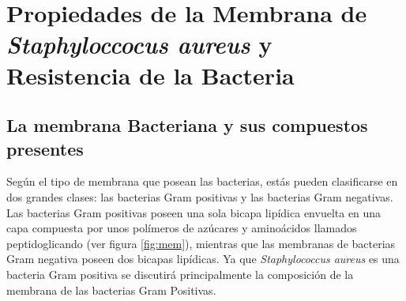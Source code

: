 \chapter{Propiedades de la Membrana de  \textit{Staphyloccocus aureus} y Resistencia de la Bacteria}
\section{La membrana Bacteriana y sus compuestos presentes}\label{ss:mem}
Seg\'{u}n el tipo de membrana que posean las bacterias, est\'{a}s pueden clasificarse en dos grandes clases: las bacterias Gram positivas y las bacterias Gram negativas. Las bacterias Gram positivas poseen una sola bicapa lip\'{i}dica envuelta en una capa compuesta por unos pol\'{i}meros de az\'{u}cares y amino\'{a}cidos llamados peptidoglicando (ver figura \ref{fig:mem}), mientras que las membranas de bacterias Gram negativa poseen dos bicapas lip\'{i}dicas. Ya que \textit{Staphylococcus aureus} es una bacteria Gram positiva se discutir\'{a} principalmente la composici\'{o}n de la membrana de las bacterias Gram Positivas.\\

